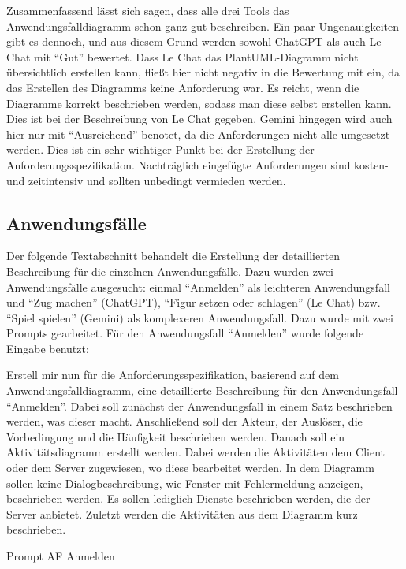 Zusammenfassend lässt sich sagen, dass alle drei Tools das Anwendungsfalldiagramm schon ganz gut beschreiben. Ein paar Ungenauigkeiten gibt 
es dennoch, und aus diesem Grund werden sowohl ChatGPT als auch Le Chat mit ``Gut'' bewertet. Dass Le Chat das PlantUML-Diagramm nicht übersichtlich 
erstellen kann, fließt hier nicht negativ in die Bewertung mit ein, da das Erstellen des Diagramms keine Anforderung war. Es reicht, wenn die 
Diagramme korrekt beschrieben werden, sodass man diese selbst erstellen kann. Dies ist bei der Beschreibung von Le Chat gegeben. Gemini hingegen 
wird auch hier nur mit ``Ausreichend'' benotet, da die Anforderungen nicht alle umgesetzt werden. Dies ist ein sehr wichtiger Punkt bei der Erstellung 
der Anforderungsspezifikation. Nachträglich eingefügte Anforderungen sind kosten- und zeitintensiv und sollten unbedingt vermieden werden.

\subsection*{Anwendungsfälle}

Der folgende Textabschnitt behandelt die Erstellung der detaillierten Beschreibung für die einzelnen Anwendungsfälle. Dazu wurden zwei Anwendungsfälle ausgesucht: 
einmal ``Anmelden'' als leichteren Anwendungsfall und ``Zug machen'' (ChatGPT), ``Figur setzen oder schlagen'' (Le Chat) bzw. ``Spiel spielen'' (Gemini) 
als komplexeren Anwendungsfall. Dazu wurde mit zwei Prompts gearbeitet. Für den Anwendungsfall ``Anmelden'' wurde folgende Eingabe benutzt:

\begin{prompt}[H]
    \begin{tcolorbox}[colback=gray!20, colframe=gray!20, boxrule=0pt, sharp corners] 
        Erstell mir nun für die Anforderungsspezifikation, basierend auf dem Anwendungsfalldiagramm, eine detaillierte Beschreibung für den Anwendungsfall ``Anmelden''. Dabei 
        soll zunächst der Anwendungsfall in einem Satz beschrieben werden, was dieser macht. Anschließend soll der Akteur, der Auslöser, die Vorbedingung und die Häufigkeit 
        beschrieben werden. Danach soll ein Aktivitätsdiagramm erstellt werden. Dabei werden die Aktivitäten dem Client oder dem Server zugewiesen, wo diese bearbeitet werden. 
        In dem Diagramm sollen keine Dialogbeschreibung, wie Fenster mit Fehlermeldung anzeigen, beschrieben werden. Es sollen lediglich Dienste beschrieben werden, die der 
        Server anbietet. Zuletzt werden die Aktivitäten aus dem Diagramm kurz beschrieben.
        \vfill
    \end{tcolorbox}
    \caption{Prompt AF Anmelden}
    \label{Prompt AF Anmelden}
\end{prompt}

